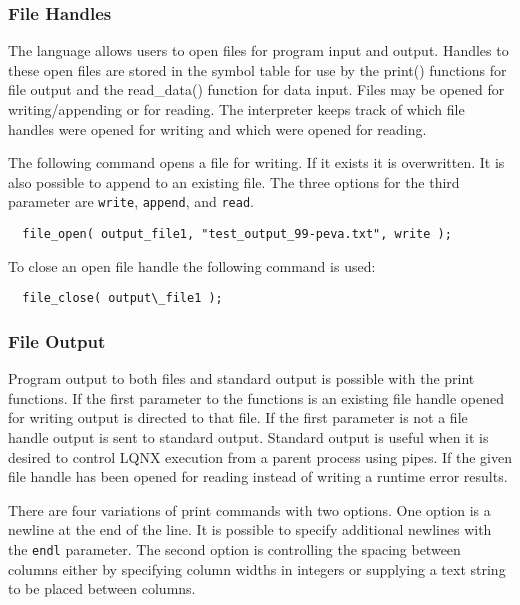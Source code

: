 \subsubsection{File Handles}

The \ModLang language allows users to open files for program input and output. Handles to these
open files are stored in the symbol table for use by the print() functions for file output and the
read\_data() function for data input. Files may be opened for writing/appending or for reading.
The \ModLang interpreter keeps track of which file handles were opened for writing and which
were opened for reading.

The following command opens a file for writing. If it exists it is overwritten. It is also possible
to append to an existing file. The three options for the third parameter are {\tt write}, {\tt append}, and {\tt read}.

\lstset{language=LQX}
\begin{lstlisting}
  file_open( output_file1, "test_output_99-peva.txt", write );
\end{lstlisting}

To close an open file handle the following command is used:

\lstset{language=LQX}
\begin{lstlisting}
  file_close( output\_file1 );
\end{lstlisting}

\subsubsection{File Output}

Program output to both files and standard output is possible with the print functions. If the first parameter to
the functions is an existing file handle opened for writing output is directed to that file. If the first parameter
is not a file handle output is sent to standard output. Standard output is useful when it is desired to control LQNX
execution from a parent process using pipes. If the given file handle has been opened for reading instead of writing
a runtime error results.

There are four variations of print commands with two options. One option is a newline at the end of the line. It is
possible to specify additional newlines with the {\tt endl} parameter. The second option is controlling the spacing
between columns either by specifying column widths in integers or supplying a text string to be placed between columns.

